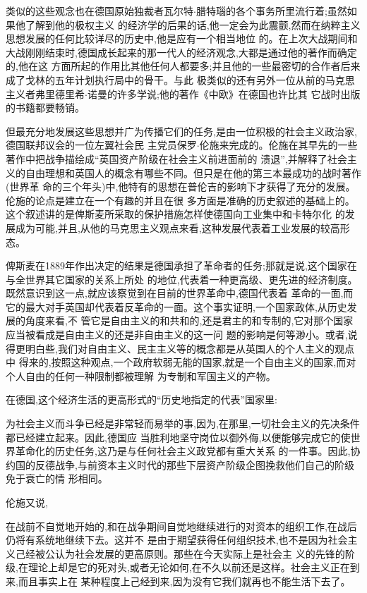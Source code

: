 ﻿\documentclass[12pt]{article}
\begin{document}
类似的这些观念也在德国原始独裁者瓦尔特$\cdot$腊特瑙的各个事务所里流行着;虽然如果他了解到他的极权主义
的经济学的后果的话,他一定会为此震颤,然而在纳粹主义思想发展的任何比较详尽的历史中,他是应有一个相当地位
的。在上次大战期间和大战刚刚结束时,德国成长起来的那一代人的经济观念,大都是通过他的著作而确定的,他在这
方面所起的作用比其他任何人都要多;并且他的一些最密切的合作者后来成了戈林的五年计划执行局中的骨干。与此
极类似的还有另外一位从前的马克思主义者弗里德里希$\cdot$诺曼的许多学说;他的著作《中欧》在德国也许比其
它战时出版的书籍都要畅销。

但最充分地发展这些思想并广为传播它们的任务,是由一位积极的社会主义政治家,德国联邦议会的一位左翼社会民
主党员保罗$\cdot$伦施来完成的。伦施在其早先的一些著作中把战争描绘成``英国资产阶级在社会主义前进面前的
溃退'',并解释了社会主义的自由理想和英国人的概念有哪些不同。但只是在他的第三本最成功的战时著作(世界革
命的三个年头)中,他特有的思想在普伦吉的影响下才获得了充分的发展。 伦施的论点是建立在一个有趣的并且在很
多方面是准确的历史叙述的基础上的。这个叙述讲的是俾斯麦所采取的保护措施怎样使德国向工业集中和卡特尔化
的发展成为可能,并且,从他的马克思主义观点来看,这种发展代表着工业发展的较高形态。

俾斯麦在1889年作出决定的结果是德国承担了革命者的任务;那就是说,这个国家在与全世界其它国家的关系上所处
的地位,代表着一种更高级、更先进的经济制度。既然意识到这一点,就应该察觉到在目前的世界革命中,德国代表着
革命的一面,而它的最大对手英国却代表着反革命的一面。这个事实证明,一个国家政体,从历史发展的角度来看,不
管它是自由主义的和共和的,还是君主的和专制的,它对那个国家应当被看成是自由主义的还是非自由主义的这一问
题的影响是何等渺小。或者,说得更明白些,我们对自由主义、民主主义等的概念都是从英国人的个人主义的观点中
得来的,按照这种观点,一个政府软弱无能的国家,就是一个自由主义的国家,而对个人自由的任何一种限制都被理解
为专制和军国主义的产物。

在德国,这个经济生活的更高形式的``历史地指定的代表''国家里:

为社会主义而斗争已经是非常轻而易举的事,因为,在那里,一切社会主义的先决条件都已经建立起来。因此,德国应
当胜利地坚守岗位以御外侮,以便能够完成它的使世界革命化的历史任务,这乃是与任何社会主义政党都有重大关系
的一件事。因此,协约国的反德战争,与前资本主义时代的那些下层资产阶级企图挽救他们自己的阶级免于衰亡的情
形相同。

伦施又说,

在战前不自觉地开始的,和在战争期间自觉地继续进行的对资本的组织工作,在战后仍将有系统地继续下去。这并不
是由于期望获得任何组织技术,也不是因为社会主义己经被公认为社会发展的更高原则。那些在今天实际上是社会主
义的先锋的阶级,在理论上却是它的死对头,或者无论如何,在不久以前还是这样。社会主义正在到来,而且事实上在
某种程度上己经到来,因为没有它我们就再也不能生活下去了。
\end{document}
